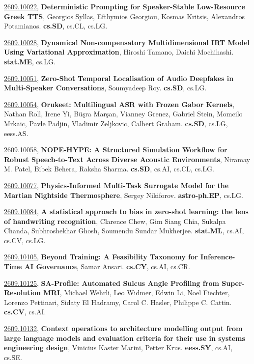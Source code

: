 \documentclass[9pt, a4paper]{article}
\theoremstyle{plain}
\theoremstyle{definition}
\theoremstyle{remark}
\newcommand{\arxivwithtarget}[3]{\hypertarget{#1}{}\href{https://arxiv.org/abs/#1}{#1}, \textbf{\textcolor{arxivblue}{#2}}, #3. }
\begin{document}
\arxivwithtarget{2609.10022}{Deterministic Prompting for Speaker-Stable Low-Resource Greek TTS}{Georgios Syllas, Efthymios Georgiou, Kosmas Kritsis, Alexandros Potamianos}\textbf{cs.SD}, cs.CL, cs.LG.



\arxivwithtarget{2609.10028}{Dynamical Non-compensatory Multidimensional IRT Model Using Variational Approximation}{Hiroshi Tamano, Daichi Mochihashi}\textbf{stat.ME}, cs.LG.



\arxivwithtarget{2609.10051}{Zero-Shot Temporal Localisation of Audio Deepfakes in Multi-Speaker Conversations}{Soumyadeep Roy}\textbf{cs.SD}, cs.LG.



\arxivwithtarget{2609.10054}{Orukeet: Multilingual ASR with Frozen Gabor Kernels}{Nathan Roll, Irene Yi, Büşra Marşan, Vianney Grenez, Gabriel Stein, Momcilo Mrkaic, Pavle Padjin, Vladimir Zeljkovic, Calbert Graham}\textbf{cs.SD}, cs.LG, eess.AS.



\arxivwithtarget{2609.10058}{NOPE-HYPE: A Structured Simulation Workflow for Robust Speech-to-Text Across Diverse Acoustic Environments}{Niramay M. Patel, Bibek Behera, Raksha Sharma}\textbf{cs.SD}, cs.AI, cs.CL, cs.LG.



\arxivwithtarget{2609.10077}{Physics-Informed Multi-Task Surrogate Model for the Martian Nightside Thermosphere}{Sergey Nikiforov}\textbf{astro-ph.EP}, cs.LG.



\arxivwithtarget{2609.10084}{A statistical approach to bias in zero-shot learning: the lens of handwriting recognition}{Clarence Chew, Gim Siang Chia, Sukalpa Chanda, Subhroshekhar Ghosh, Soumendu Sundar Mukherjee}\textbf{stat.ML}, cs.AI, cs.CV, cs.LG.



\arxivwithtarget{2609.10105}{Beyond Training: A Feasibility Taxonomy for Inference-Time AI Governance}{Samar Ansari}\textbf{cs.CY}, cs.AI, cs.CR.



\arxivwithtarget{2609.10125}{SA-Profile: Automated Sulcus Angle Profiling from Super-Resolution MRI}{Michael Wehrli, Leo Widmer, Edwin Li, Noel Fiechter, Lorenzo Pettinari, Sidaty El Hadramy, Carol C. Hasler, Philippe C. Cattin}\textbf{cs.CV}, cs.AI.



\arxivwithtarget{2609.10132}{Context operations to architecture modelling output from large language models and evaluation criteria for their use in systems engineering design}{Vinicius Kaster Marini, Petter Krus}\textbf{eess.SY}, cs.AI, cs.SE.
\end{document}
